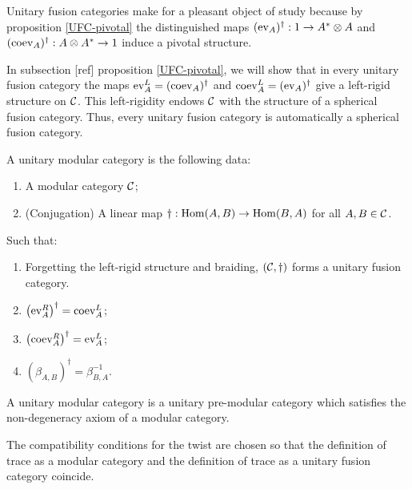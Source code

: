 \begin{rem}
Unitary fusion categories make for a pleasant object of study because by proposition \ref{UFC-pivotal} the distinguished maps $(\operatorname{ev}_A)^{\dagger}:1\to A^{*}\otimes A$ and $(\operatorname{coev}_A)^{\dagger}:A\otimes A^{*}\to 1$ induce a pivotal structure.
\end{rem}

\begin{rem} In subsection [ref] proposition \ref{UFC-pivotal}, we will show that in every unitary fusion category the maps $\operatorname{ev}_{A}^L = (\operatorname{coev}_{A})^{\dagger}$ and $\operatorname{coev}^L_{A}=(\operatorname{ev}_A)^{\dagger}$ give a left-rigid structure on ${\mathcal C}$. This left-rigidity endows ${\mathcal C}$ with the structure of a spherical fusion category. Thus, every unitary fusion category is automatically a spherical fusion category.
\end{rem}

\begin{defn} A unitary modular category is the following data:

\begin{enumerate}
\item A modular category ${\mathcal C}$;
\item (Conjugation) A linear map $\dagger: \operatorname{Hom}(A,B)\to \operatorname{Hom}(B,A)$ for all $A,B\in {\mathcal C}$.
\end{enumerate}

Such that:

\begin{enumerate}
\item Forgetting the left-rigid structure and braiding, $\left({\mathcal C},\dagger\right)$ forms a unitary fusion category.
\item $\left(\operatorname{ev}_{A}^R\right)^{\dagger}=\operatorname{coev}_{A}^L$;
\item $\left(\operatorname{coev}_{A}^R\right)^{\dagger}=\operatorname{ev}_{A}^L$;
\item $\left(\beta_{A,B}\right)^{\dagger}=\beta_{B,A}^{-1}$.
\end{enumerate}
\end{defn}

\begin{defn} A unitary modular category is a unitary pre-modular category which satisfies the non-degeneracy axiom of a modular category.
\end{defn}

\begin{rem} The compatibility conditions for the twist are chosen so that the definition of trace as a modular category and the definition of trace as a unitary fusion category coincide.
\end{rem}

